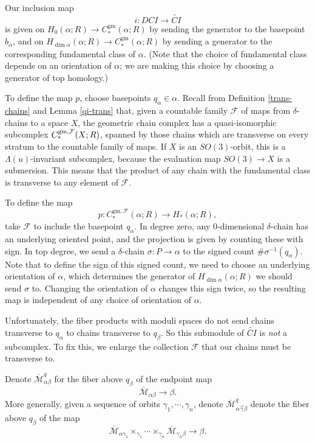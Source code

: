 \documentclass{memo-l}
\theoremstyle{definition}
\theoremstyle{remark}
\numberwithin{section}{chapter}
\numberwithin{equation}{chapter}
\begin{document}
Our inclusion map $$i: DCI \to \widetilde{CI}$$ is given on $H_0(\alpha; R) \to C_*^{\text{gm}}(\alpha;R)$ by sending the generator to the basepoint $b_\alpha$, and on $H_{\dim \alpha}(\alpha;R) \to C_*^{\text{gm}}(\alpha;R)$ by sending a generator to the corresponding fundamental class of $\alpha$. (Note that the choice of fundamental class depends on an orientation of $\alpha$; we are making this choice by choosing a generator of top homology.)

To define the map $p$, choose basepoints $q_\alpha \in \alpha$. Recall from Definition \ref{trans-chains} and Lemma \ref{qi-trans} that, given a countable family $\mathcal F$ of maps from $\delta$-chains to a space $X$, the geometric chain complex has a quasi-isomorphic subcomplex $C_*^{\textup{gm},\mathcal F}(X;R)$, spanned by those chains which are transverse on every stratum to the countable family of maps. If $X$ is an $SO(3)$-orbit, this is a $\Lambda(u)$-invariant subcomplex, because the evaluation map $SO(3) \to X$ is a submersion. This means that the product of any chain with the fundamental class is transverse to any element of $\mathcal F$. 

To define the map $$p: C_*^{\text{gm},\mathcal F}(\alpha;R) \to H_*(\alpha;R),$$ take $\mathcal F$ to include the basepoint $q_\alpha$. In degree zero, any 0-dimensional $\delta$-chain has an underlying oriented point, and the projection is given by counting these with sign. In top degree, we send a $\delta$-chain $\sigma: P \to \alpha$ to the signed count $\# \sigma^{-1}(q_\alpha)$. Note that to define the sign of this signed count, we need to choose an underlying orientation of $\alpha$, which determines the generator of $H_{\dim \alpha}(\alpha; R)$ we should send $\sigma$ to. Changing the orientation of $\alpha$ changes this sign twice, so the resulting map is independent of any choice of orientation of $\alpha$.

Unfortunately, the fiber products with moduli spaces do not send chains transverse to $q_\alpha$ to chains transverse to $q_\beta$. So this submodule of $\widetilde{CI}$ is \emph{not} a subcomplex. To fix this, we enlarge the collection $\mathcal F$ that our chains must be transverse to. 

Denote $\overline{\mathcal M}^q_{\alpha \beta}$ for the fiber above $q_\beta$ of the endpoint map $$\overline{\mathcal M}_{\alpha \beta} \to \beta.$$ More generally, given a sequence of orbits $\gamma_1, \cdots, \gamma_n$, denote $\overline{\mathcal M}^q_{\alpha \vec{\gamma} \beta}$ denote the fiber above $q_\beta$ of the map $$\overline{\mathcal M}_{\alpha \gamma_1} \times_{\gamma_1} \cdots \times_{\gamma_n} \overline{\mathcal M}_{\gamma_n \beta} \to \beta.$$ 
\end{document}
